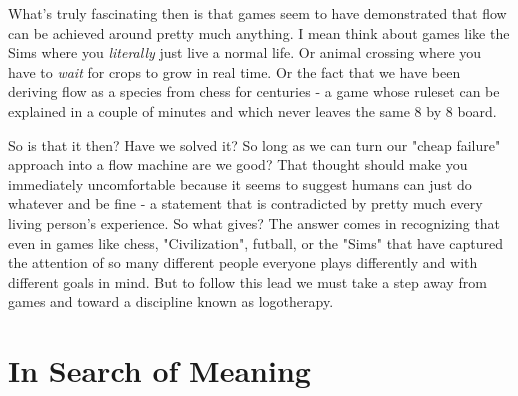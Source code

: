 \documentclass[11pt,a5paper]{book}
\begin{document}
What's truly fascinating then is that games seem to have demonstrated that flow can be achieved around pretty much anything. I mean think about games like the Sims where you \textit{literally} just live a normal life. Or animal crossing where you have to \textit{wait} for crops to grow in real time. Or the fact that we have been deriving flow as a species from chess for centuries - a game whose ruleset can be explained in a couple of minutes and which never leaves the same 8 by 8 board.
\newline

So is that it then? Have we solved it? So long as we can turn our "cheap failure" approach into a flow machine are we good? That thought should make you immediately uncomfortable because it seems to suggest humans can just do whatever and be fine - a statement that is contradicted by pretty much every living person's experience. So what gives? The answer comes in recognizing that even in games like chess, "Civilization", futball, or the "Sims" that have captured the attention of so many different people everyone plays differently and with different goals in mind. But to follow this lead we must take a step away from games and toward a discipline known as logotherapy.

\section{In Search of Meaning}





\end{document}

